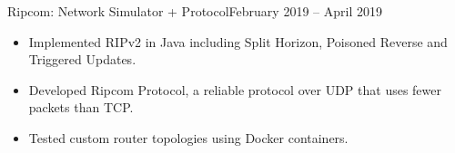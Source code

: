 \begin{cvsubsection}{Ripcom: \href{ https://github.com/a3y3/Ripcom}{}}{Network Simulator + Protocol}{February 2019 -- April 2019}
	\begin{itemize}
        \item Implemented RIPv2 in Java including Split Horizon, Poisoned Reverse and Triggered Updates.
        \item Developed Ripcom Protocol, a reliable protocol over UDP that uses fewer packets than TCP.
        \item Tested custom router topologies using Docker containers.
	\end{itemize}
\end{cvsubsection}